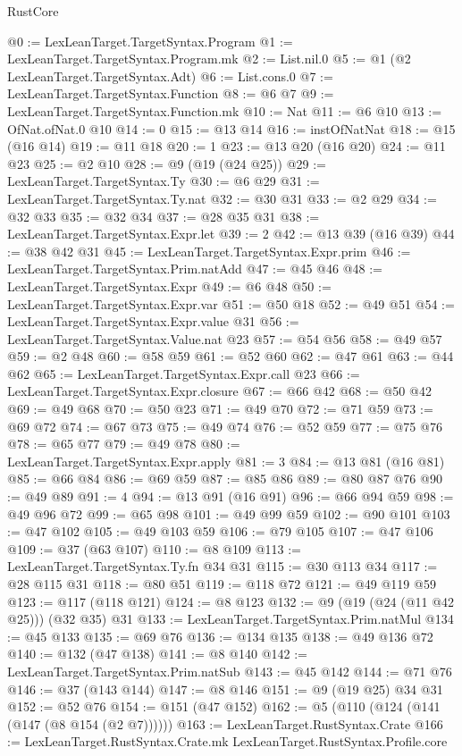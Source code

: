 \begin{lexlean}{RustCore}
\begin{coremodule}
@0 := LexLeanTarget.TargetSyntax.Program
@1 := LexLeanTarget.TargetSyntax.Program.mk
@2 := List.nil.{0}
@5 := @1 (@2 LexLeanTarget.TargetSyntax.Adt)
@6 := List.cons.{0}
@7 := LexLeanTarget.TargetSyntax.Function
@8 := @6 @7
@9 := LexLeanTarget.TargetSyntax.Function.mk
@10 := Nat
@11 := @6 @10
@13 := OfNat.ofNat.{0} @10
@14 := 0
@15 := @13 @14
@16 := instOfNatNat
@18 := @15 (@16 @14)
@19 := @11 @18
@20 := 1
@23 := @13 @20 (@16 @20)
@24 := @11 @23
@25 := @2 @10
@28 := @9 (@19 (@24 @25))
@29 := LexLeanTarget.TargetSyntax.Ty
@30 := @6 @29
@31 := LexLeanTarget.TargetSyntax.Ty.nat
@32 := @30 @31
@33 := @2 @29
@34 := @32 @33
@35 := @32 @34
@37 := @28 @35 @31
@38 := LexLeanTarget.TargetSyntax.Expr.let
@39 := 2
@42 := @13 @39 (@16 @39)
@44 := @38 @42 @31
@45 := LexLeanTarget.TargetSyntax.Expr.prim
@46 := LexLeanTarget.TargetSyntax.Prim.natAdd
@47 := @45 @46
@48 := LexLeanTarget.TargetSyntax.Expr
@49 := @6 @48
@50 := LexLeanTarget.TargetSyntax.Expr.var
@51 := @50 @18
@52 := @49 @51
@54 := LexLeanTarget.TargetSyntax.Expr.value @31
@56 := LexLeanTarget.TargetSyntax.Value.nat @23
@57 := @54 @56
@58 := @49 @57
@59 := @2 @48
@60 := @58 @59
@61 := @52 @60
@62 := @47 @61
@63 := @44 @62
@65 := LexLeanTarget.TargetSyntax.Expr.call @23
@66 := LexLeanTarget.TargetSyntax.Expr.closure
@67 := @66 @42
@68 := @50 @42
@69 := @49 @68
@70 := @50 @23
@71 := @49 @70
@72 := @71 @59
@73 := @69 @72
@74 := @67 @73
@75 := @49 @74
@76 := @52 @59
@77 := @75 @76
@78 := @65 @77
@79 := @49 @78
@80 := LexLeanTarget.TargetSyntax.Expr.apply
@81 := 3
@84 := @13 @81 (@16 @81)
@85 := @66 @84
@86 := @69 @59
@87 := @85 @86
@89 := @80 @87 @76
@90 := @49 @89
@91 := 4
@94 := @13 @91 (@16 @91)
@96 := @66 @94 @59
@98 := @49 @96 @72
@99 := @65 @98
@101 := @49 @99 @59
@102 := @90 @101
@103 := @47 @102
@105 := @49 @103 @59
@106 := @79 @105
@107 := @47 @106
@109 := @37 (@63 @107)
@110 := @8 @109
@113 := LexLeanTarget.TargetSyntax.Ty.fn @34 @31
@115 := @30 @113 @34
@117 := @28 @115 @31
@118 := @80 @51
@119 := @118 @72
@121 := @49 @119 @59
@123 := @117 (@118 @121)
@124 := @8 @123
@132 := @9 (@19 (@24 (@11 @42 @25))) (@32 @35) @31
@133 := LexLeanTarget.TargetSyntax.Prim.natMul
@134 := @45 @133
@135 := @69 @76
@136 := @134 @135
@138 := @49 @136 @72
@140 := @132 (@47 @138)
@141 := @8 @140
@142 := LexLeanTarget.TargetSyntax.Prim.natSub
@143 := @45 @142
@144 := @71 @76
@146 := @37 (@143 @144)
@147 := @8 @146
@151 := @9 (@19 @25) @34 @31
@152 := @52 @76
@154 := @151 (@47 @152)
@162 := @5 (@110 (@124 (@141 (@147 (@8 @154 (@2 @7))))))
@163 := LexLeanTarget.RustSyntax.Crate
@166 := LexLeanTarget.RustSyntax.Crate.mk LexLeanTarget.RustSyntax.Profile.core

\end{coremodule}
\end{lexlean}
